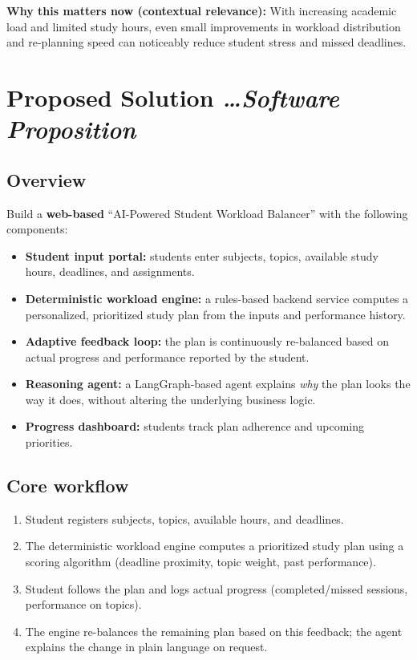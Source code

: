 \documentclass[11pt,a4paper]{article}
\newcommand{\BvrHint}[1]{%
  {\normalfont\normalsize\itshape\hfill #1}}
\begin{document}
\textbf{Why this matters now (contextual relevance):} With increasing academic load and limited study hours, even small improvements in workload distribution and re-planning speed can noticeably reduce student stress and missed deadlines.

\section{Proposed Solution %
\BvrHint{\ldots Software Proposition}}
\subsection{Overview}
Build a \textbf{web-based} ``AI-Powered Student Workload Balancer''
with the following components:
\begin{itemize}[leftmargin=0.7cm]
    \item \textbf{Student input portal:} students enter subjects, topics, available study hours, deadlines, and assignments.
    \item \textbf{Deterministic workload engine:} a rules-based backend service computes a personalized, prioritized study plan from the inputs and performance history.
    \item \textbf{Adaptive feedback loop:} the plan is continuously re-balanced based on actual progress and performance reported by the student.
    \item \textbf{Reasoning agent:} a LangGraph-based agent explains \emph{why} the plan looks the way it does, without altering the underlying business logic.
    \item \textbf{Progress dashboard:} students track plan adherence and upcoming priorities.
\end{itemize}

\subsection{Core workflow}
\begin{enumerate}[leftmargin=0.7cm]
    \item Student registers subjects, topics, available hours, and deadlines.
    \item The deterministic workload engine computes a prioritized study plan using a scoring algorithm (deadline proximity, topic weight, past performance).
    \item Student follows the plan and logs actual progress (completed/missed sessions, performance on topics).
    \item The engine re-balances the remaining plan based on this feedback; the agent explains the change in plain language on request.
\end{enumerate}
\end{document}
